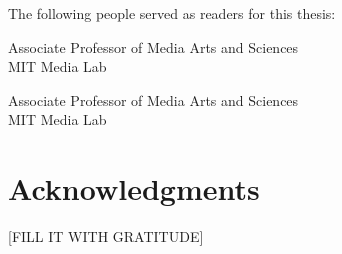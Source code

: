 %
%
%

\begin{titlepage}
\begin{large}
The following people served as readers for this thesis:

\signature{Sepandar Kamvar}{Associate Professor of Media Arts and Sciences \\
   MIT Media Lab}

\signature{Iyad Rahwan}{Associate Professor of Media Arts and Sciences \\
   MIT Media Lab}
 
\end{large}
\end{titlepage}
 
\cleardoublepage

\section*{Acknowledgments}

[FILL IT WITH GRATITUDE]





